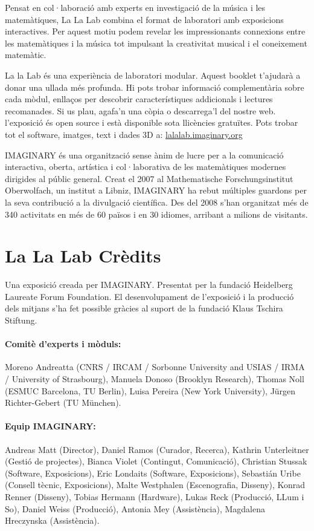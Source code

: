 Pensat en col·laboració amb experts en investigació de la música i les matemàtiques, La La Lab combina el format de laboratori amb exposicions interactives. Per aquest motiu podem revelar les impressionants connexions entre les matemàtiques i la música tot impulsant la creativitat musical i el coneixement matemàtic.

La la Lab és una experiència de laboratori modular. Aquest booklet t'ajudarà a donar una ullada més profunda. Hi pots trobar informació complementària sobre cada mòdul, enllaços per descobrir característiques addicionals i lectures recomanades. Si us plau, agafa'n una còpia o descarrega'l del nostre web. l'exposició és open source i està disponible sota llicències gratuïtes. Pots trobar tot el software, imatges, text i dades 3D a: \url{lalalab.imaginary.org}

IMAGINARY és una organització sense ànim de lucre per a la comunicació interactiva, oberta, artística i col·laborativa de les matemàtiques modernes dirigides al públic general. Creat el 2007 al Mathematische Forschungsinstitut Oberwolfach, un institut a Libniz, IMAGINARY ha rebut múltiples guardons per la seva contribució a la divulgació científica. Des del 2008 s'han organitzat més de 340 activitats en més de 60 països i en 30 idiomes, arribant a milions de visitants.


\section*{La La Lab Crèdits}
\footnotesize
Una exposició creada per IMAGINARY.
Presentat per la fundació Heidelberg Laureate Forum Foundation.
El desenvolupament de l'exposició i la producció dels mitjans s'ha fet possible gràcies al suport de la fundació Klaus Tschira Stiftung.

\paragraph{Comitè d'experts i mòduls:}
Moreno Andreatta (CNRS / IRCAM / Sorbonne University and USIAS / IRMA / University of Strasbourg), Manuela Donoso (Brooklyn Research), Thomas Noll (ESMUC Barcelona, TU Berlin), Luisa Pereira (New York University), Jürgen Richter-Gebert (TU München).


\paragraph{Equip IMAGINARY:}
Andreas Matt (Director), Daniel Ramos (Curador, Recerca), Kathrin Unterleitner (Gestió de projectes), Bianca Violet (Contingut, Comunicació), Christian Stussak (Software, Exposicions), Eric Londaits (Software, Exposicions), Sebastián Uribe (Consell tècnic, Exposicions), Malte Westphalen (Escenografia, Disseny), Konrad Renner (Disseny), Tobias Hermann (Hardware), Lukas Reck (Producció, LLum i So), Daniel Weiss (Producció), Antonia Mey (Assistència), Magdalena Hreczynska (Assistència).

